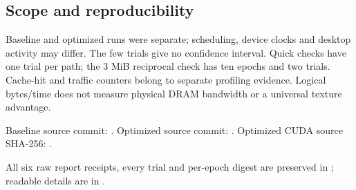 \subsection{Scope and reproducibility}

Baseline and optimized runs were separate; scheduling, device clocks and desktop activity may differ. The few trials give no confidence interval. Quick checks have one trial per path; the 3 MiB reciprocal check has ten epochs and two trials. Cache-hit and traffic counters belong to separate profiling evidence. Logical bytes/time does not measure physical DRAM bandwidth or a universal texture advantage.

Baseline source commit: . Optimized source commit: . Optimized CUDA source SHA-256: .

All six raw report receipts, every trial and per-epoch digest are preserved in ; readable details are in .
